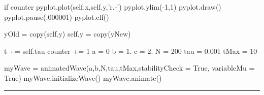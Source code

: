 \begin{codeexample}
\begin{VerbatimOut}{\listingFile}
            if counter %
                pyplot.plot(self.x,self.y,'r.-')
                pyplot.ylim(-1,1)
                pyplot.draw()
                pyplot.pause(.000001)
                pyplot.clf()


            yOld = copy(self.y)
            self.y = copy(yNew)


            t += self.tau
            counter += 1
a = 0
b = 1.
c = 2.
N = 200
tau = 0.001
tMax = 10

myWave = animatedWave(a,b,N,tau,tMax,stabilityCheck = True, variableMu = True)
myWave.initializeWave()
myWave.animate()
\end{VerbatimOut}
\end{codeexample}
\else
\noindent\rule{5 in}{0.01 in}
\fi




